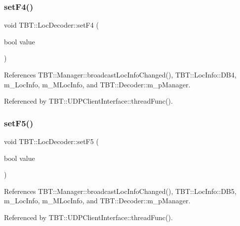 \subsubsection{\texorpdfstring{set\+F4()}{setF4()}}
{\footnotesize\ttfamily void T\+B\+T\+::\+Loc\+Decoder\+::set\+F4 (\begin{DoxyParamCaption}\item[{bool}]{value }\end{DoxyParamCaption})\hspace{0.3cm}{\ttfamily [inline]}}



References T\+B\+T\+::\+Manager\+::broadcast\+Loc\+Info\+Changed(), T\+B\+T\+::\+Loc\+Info\+::\+D\+B4, m\+\_\+\+Loc\+Info, m\+\_\+\+M\+Loc\+Info, and T\+B\+T\+::\+Decoder\+::m\+\_\+p\+Manager.



Referenced by T\+B\+T\+::\+U\+D\+P\+Client\+Interface\+::thread\+Func().

\mbox{\label{classTBT_1_1LocDecoder_a4e548e580a6ec3c93369af591281e00f_a4e548e580a6ec3c93369af591281e00f}} 
\subsubsection{\texorpdfstring{set\+F5()}{setF5()}}
{\footnotesize\ttfamily void T\+B\+T\+::\+Loc\+Decoder\+::set\+F5 (\begin{DoxyParamCaption}\item[{bool}]{value }\end{DoxyParamCaption})\hspace{0.3cm}{\ttfamily [inline]}}



References T\+B\+T\+::\+Manager\+::broadcast\+Loc\+Info\+Changed(), T\+B\+T\+::\+Loc\+Info\+::\+D\+B5, m\+\_\+\+Loc\+Info, m\+\_\+\+M\+Loc\+Info, and T\+B\+T\+::\+Decoder\+::m\+\_\+p\+Manager.



Referenced by T\+B\+T\+::\+U\+D\+P\+Client\+Interface\+::thread\+Func().

\mbox{\label{classTBT_1_1LocDecoder_af971c14a9437b240d17ab4ca9ffb3e67_af971c14a9437b240d17ab4ca9ffb3e67}} 
